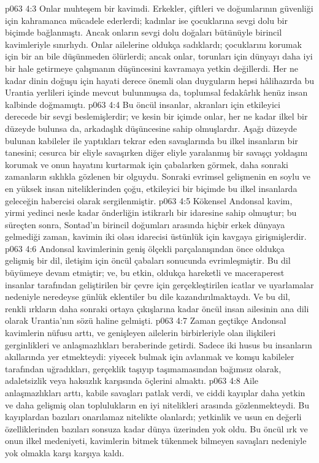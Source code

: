 \vs p063 4:3 Onlar muhteşem bir kavimdi. Erkekler, çiftleri ve doğumlarının güvenliği için kahramanca mücadele ederlerdi; kadınlar ise çocuklarına sevgi dolu bir biçimde bağlanmıştı. Ancak onların sevgi dolu doğaları bütünüyle birincil kavimleriyle sınırlıydı. Onlar ailelerine oldukça sadıklardı; çocuklarını korumak için bir an bile düşünmeden ölürlerdi; ancak onlar, torunları için dünyayı daha iyi bir hale getirmeye çalışmanın düşüncesini kavramaya yetkin değillerdi. Her ne kadar dinin doğuşu için hayati derece önemli olan duyguların hepsi hâlihazırda bu Urantia yerlileri içinde mevcut bulunmuşsa da, toplumsal fedakârlık henüz insan kalbinde doğmamıştı.
\vs p063 4:4 Bu öncül insanlar, akranları için etkileyici derecede bir sevgi beslemişlerdir; ve kesin bir içimde onlar, her ne kadar ilkel bir düzeyde bulunsa da, arkadaşlık düşüncesine sahip olmuşlardır. Aşağı düzeyde bulunan kabileler ile yaptıkları tekrar eden savaşlarında bu ilkel insanların bir tanesini; cesurca bir eliyle savaşırken diğer eliyle yaralanmış bir savaşçı yoldaşını korumak ve onun hayatını kurtarmak için çabalarken görmek, daha sonraki zamanların sıklıkla gözlenen bir olguydu. Sonraki evrimsel gelişmenin en soylu ve en yüksek insan niteliklerinden çoğu, etkileyici bir biçimde bu ilkel insanlarda geleceğin habercisi olarak sergilenmiştir.
\vs p063 4:5 Kökensel Andonsal kavim, yirmi yedinci nesle kadar önderliğin istikrarlı bir idaresine sahip olmuştur; bu süreçten sonra, Sontad’ın birincil doğumları arasında hiçbir erkek dünyaya gelmediği zaman, kavimin iki olası idarecisi üstünlük için kavgaya girişmişlerdir.
\vs p063 4:6 Andonsal kavimlerinin geniş ölçekli parçalanışından önce oldukça gelişmiş bir dil, iletişim için öncül çabaları sonucunda evrimleşmiştir. Bu dil büyümeye devam etmiştir; ve, bu etkin, oldukça hareketli ve maceraperest insanlar tarafından geliştirilen bir çevre için gerçekleştirilen icatlar ve uyarlamalar nedeniyle neredeyse günlük eklentiler bu dile kazandırılmaktaydı. Ve bu dil, renkli ırkların daha sonraki ortaya çıkışlarına kadar öncül insan ailesinin ana dili olarak Urantia’nın sözü haline gelmişti.
\vs p063 4:7 Zaman geçtikçe Andonsal kavimlerin nüfusu arttı, ve genişleyen ailelerin birbirleriyle olan ilişkileri gerginlikleri ve anlaşmazlıkları beraberinde getirdi. Sadece iki husus bu insanların akıllarında yer etmekteydi: yiyecek bulmak için avlanmak ve komşu kabileler tarafından uğradıkları, gerçeklik taşıyıp taşımamasından bağımsız olarak, adaletsizlik veya haksızlık karşısında öçlerini almaktı.
\vs p063 4:8 Aile anlaşmazlıkları arttı, kabile savaşları patlak verdi, ve ciddi kayıplar daha yetkin ve daha gelişmiş olan toplulukların en iyi nitelikleri arasında gözlenmekteydi. Bu kayıplardan bazıları onarılamaz nitelikte olanlardı; yetkinlik ve usun en değerli özelliklerinden bazıları sonsuza kadar dünya üzerinden yok oldu. Bu öncül ırk ve onun ilkel medeniyeti, kavimlerin bitmek tükenmek bilmeyen savaşları nedeniyle yok olmakla karşı karşıya kaldı.
